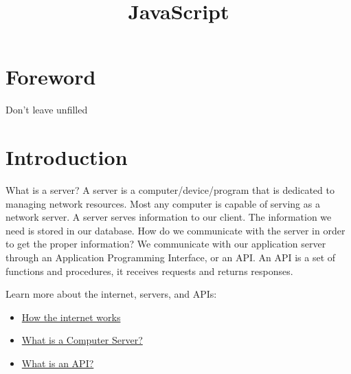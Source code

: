 \documentclass{42-en}
\begin{document}
\title{JavaScript}
\maketitle

\tableofcontents


\chapter{Foreword}

Don't leave unfilled


\chapter{Introduction}

What is a server? A server is a computer/device/program that is dedicated to managing network resources. Most any computer is capable of serving as a network server. A server serves information to our client. The information we need is stored in our database. How do we communicate with the server in order to get the proper information? We communicate with our application server through an Application Programming Interface, or an API. An API is a set of functions and procedures, it receives requests and returns responses.

Learn more about the internet, servers, and APIs:
\begin{itemize}\itemsep1pt
\item \href{https://www.youtube.com/watch?v=ZhEf7e4kopM&list=PLzdnOPI1iJNfMRZm5DDxco3UdsFegvuB7&index=2}{How the internet works}
\item \href{https://www.youtube.com/watch?v=TQQA8RpKxqg}{What is a Computer Server?}
\item \href{https://www.youtube.com/watch?v=s7wmiS2mSXY}{What is an API?}
\end{itemize}
\end{document}
